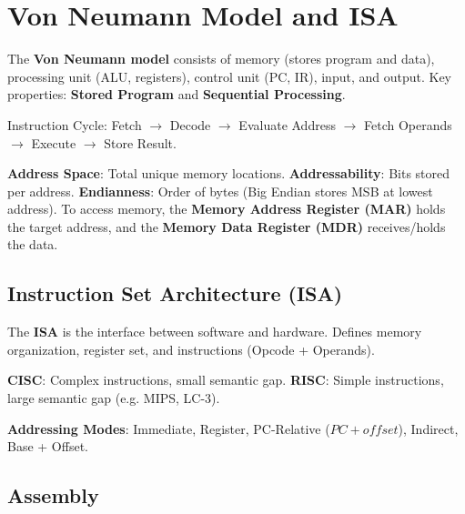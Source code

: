 \section{Von Neumann Model and ISA}

\begin{definition}
The \textbf{Von Neumann model} consists of memory (stores program and data), processing unit (ALU, registers), control unit (PC, IR), input, and output.
Key properties: \textbf{Stored Program} and \textbf{Sequential Processing}.
\end{definition}

\begin{remark}
Instruction Cycle: Fetch $\to$ Decode $\to$ Evaluate Address $\to$ Fetch Operands $\to$ Execute $\to$ Store Result.
\end{remark}

\begin{definition}
\textbf{Address Space}: Total unique memory locations.
\textbf{Addressability}: Bits stored per address.
\textbf{Endianness}: Order of bytes (Big Endian stores MSB at lowest address).
To access memory, the \textbf{Memory Address Register (MAR)} holds the target address, and the \textbf{Memory Data Register (MDR)} receives/holds the data.
\end{definition}

\subsection{Instruction Set Architecture (ISA)}

\begin{definition}
The \textbf{ISA} is the interface between software and hardware. Defines memory organization, register set, and instructions (Opcode + Operands).
\end{definition}

\begin{lemma}
\textbf{CISC}: Complex instructions, small semantic gap.
\textbf{RISC}: Simple instructions, large semantic gap (e.g. MIPS, LC-3).
\end{lemma}

\begin{definition}
\textbf{Addressing Modes}: Immediate, Register, PC-Relative ($PC + offset$), Indirect, Base + Offset.
\end{definition}

\subsection{Assembly}

